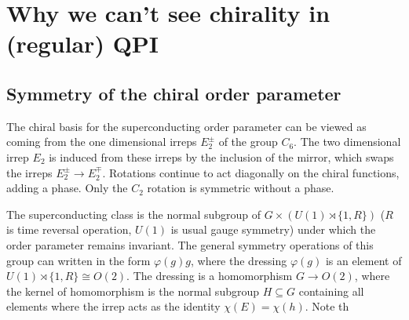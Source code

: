 \documentclass[aps,prb,twocolumn,superscriptaddress,nofootinbib]{revtex4-2}
\begin{document}
\section{Why we can't see chirality in (regular) QPI}




\subsection{Symmetry of the chiral order parameter}

The chiral basis for the superconducting order parameter can be viewed as coming from the one dimensional irreps $E^{\pm}_{2}$ of the group $C_6$. The two dimensional irrep $E_2$ is induced from these irreps by the inclusion of the mirror, which swaps the irreps $E^{\pm}_{2} \rightarrow E^{\mp}_{2}$. Rotations continue to act diagonally on the chiral functions, adding a phase. Only the $C_2$ rotation is symmetric without a phase.

The superconducting class is the normal subgroup of $G \times (U(1) \rtimes \{ 1, R \})$ ($R$ is time reversal operation, $U(1)$ is usual gauge symmetry) under which the order parameter remains invariant.
The general symmetry operations of this group can written in the form $\varphi (g) g$, where the dressing $\varphi (g)$ is an element of $U(1) \rtimes \{ 1, R \} \cong O(2)$.
The dressing is a homomorphism $G \rightarrow O(2)$, where the kernel of homomorphism is the normal subgroup $H \subseteq G$ containing all elements where the irrep acts as the identity $\chi (E) = \chi (h)$. Note th
\end{document}
